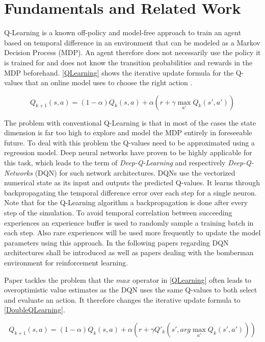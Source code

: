 \section{Fundamentals and Related Work} \label{fundamentals_related_work}

Q-Learning is a known off-policy and model-free approach to train an agent based on temporal difference in an environment that can be modeled as a Markov Decision Process (MDP). An agent therefore does not necessarily use the policy it is trained for and does not know the transition probabilities and rewards in the MDP beforehand. \autoref{QLearning} shows the iterative update formula for the Q-values that an online model uses to choose the right action \cite{Geron2018}.

\begin{equation} \label{QLearning}
	Q_{k+1}(s,a) = (1-\alpha) Q_k(s,a) + \alpha(r + \gamma \max_{a'} Q_k(s',a')) 
\end{equation}

The problem with conventional Q-Learning is that in most of the cases the state dimension is far too high to explore and model the MDP entirely in foreseeable future. To deal with this problem the Q-values need to be approximated using a regression model. Deep neural networks have proven to be highly applicable for this task, which leads to the term of \textit{Deep-Q-Learning} and respectively \textit{Deep-Q-Networks} (DQN) for such network architectures. DQNs use the vectorized numerical state as its input and outputs the predicted Q-values. It learns through backpropagating the temporal difference error over each step for a single neuron. Note that for the Q-Learning algorithm a backpropagation is done after every step of the simulation. To avoid temporal correlation between succeeding experiences an experience buffer is used to randomly sample a training batch in each step. Also rare experiences will be used more frequently to update the model parameters using this approach. In the following papers regarding DQN architectures shall be introduced as well as papers dealing with the bomberman environment for reinforcement learning. 

Paper \cite{vanHasselt2015} tackles the problem that the $max$ operator in \ref{QLearning} often leads to overoptimistic value estimates as the DQN uses the same Q-values to both select and evaluate an action. It therefore changes the iterative update formula to \ref{DoubleQLearning}.

\begin{equation} \label{DoubleQLearning}
	Q_{k+1}(s,a) = (1-\alpha) Q_k(s,a) + \alpha(r + \gamma Q'_k(s', arg\max_{a'} Q_k(s',a'))) 
\end{equation}

